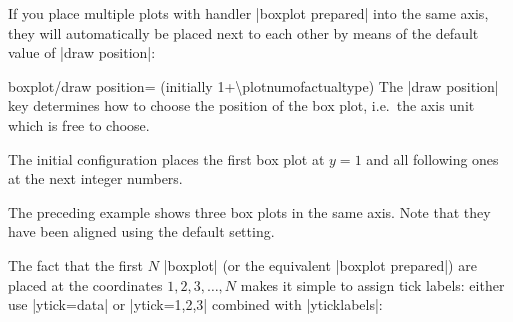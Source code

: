 	If you place multiple plots with handler |boxplot prepared| into the same axis, they will automatically be placed next to each other by means of the default value of |draw position|:


\begin{pgfplotskey}{boxplot/draw position= (initially 1+\textbackslash plotnumofactualtype)}
	The |draw position| key determines how to choose the position of the box plot, i.e.\ the axis unit which is free to choose.

	The initial configuration places the first box plot at $y=1$ and all following ones at the next integer numbers.
\begin{codeexample}[]
\end{codeexample}
	The preceding example shows three box plots in the same axis. Note that they have been aligned using the default setting.

	The fact that the first $N$ |boxplot| (or the equivalent |boxplot prepared|) are placed at the coordinates $1,2,3, \dotsc,N$ makes it simple to assign tick labels: either use |ytick=data| or |ytick=1,2,3| combined with |yticklabels|:
\begin{codeexample}[]
\end{codeexample}
\end{pgfplotskey}
